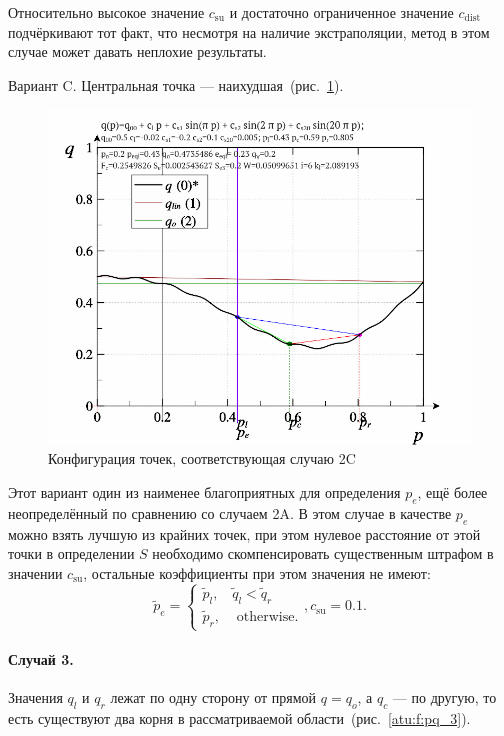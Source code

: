Относительно высокое значение
$ c_\mathrm{su}$ и достаточно ограниченное значение $c_\mathrm{dist}$
подчёркивают тот факт, что несмотря на наличие экстраполяции,
метод в этом случае может давать неплохие результаты.


Вариант C. \label{atu:d:p_eql_2C}%
Центральная точка --- наихудшая~(рис.~\ref{atu:f:pq_2C}).

\begin{figure}[htb!]
  \centerline{\includegraphics[width=60\TW]{p/pq_sin-p_pq_cbad.png} }
  \caption{Конфигурация точек, соответствующая случаю 2C}
  \label{atu:f:pq_2C}
\end{figure}

Этот вариант один из наименее благоприятных для определения $p_e$,
ещё более неопределённый по сравнению со случаем 2A.
В этом случае в качестве $p_e$ можно взять лучшую из крайних точек,
при этом нулевое расстояние от этой точки в определении $S$
необходимо скомпенсировать существенным штрафом в значении $c_\mathrm{su}$,
остальные коэффициенты при этом значения не имеют:
%
\begin{equation}
  \tilde{p}_e
  =
  \begin{cases}
    \tilde{p}_{l}, & \tilde{q}_l < \tilde{q}_r
    \\
    \tilde{p}_{r}, & \text{ otherwise}.
  \end{cases}
  ,
  c_\mathrm{su} = 0.1 .
  \label{atu:eq:pr_e2C}
\end{equation}

\paragraph{Случай 3.} %
Значения $q_l$ и $q_r$ лежат по одну сторону от прямой $q=q_o$,
а $q_c$ --- по другую, то есть существуют два корня в рассматриваемой области~(рис.~\ref{atu:f:pq_3}).

